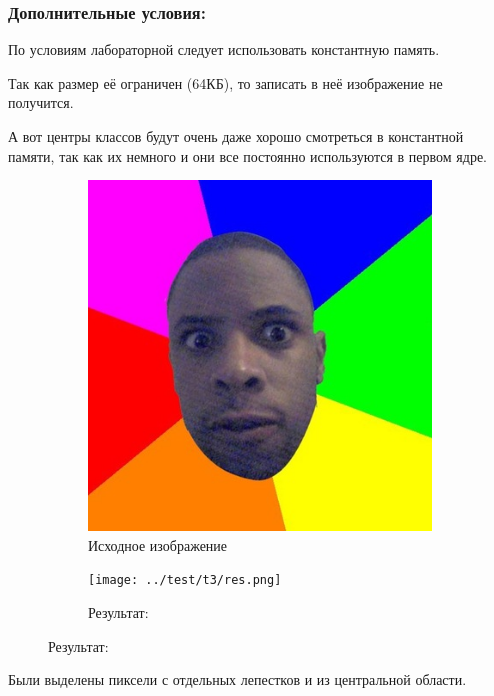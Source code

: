 \documentclass[12pt]{article}
\begin{document}
\subsubsection*{Дополнительные условия:}

По условиям лабораторной следует использовать константную память.

Так как размер её ограничен (64КБ), то записать в неё изображение не получится.

А вот центры классов будут очень даже хорошо смотреться в константной памяти,
так как их немного и они все постоянно используются в первом ядре.

{
}

\newpage


\begin{figure}[!tbh]
	\caption*{Малое изображение: 400x408}
	\begin{subfigure}{0.49\textwidth}
		\centering
		\caption*{Исходное изображение}
		\includegraphics[scale=0.4]{../test/images/nigger.png}
	\end{subfigure}
	\begin{subfigure}{0.49\textwidth}
		\centering
		\caption*{Результат:}
		\texttt{[image: ../test/t3/res.png]}
	\end{subfigure}
\end{figure}

Были выделены пиксели с отдельных лепестков и из центральной области.
\end{document}
